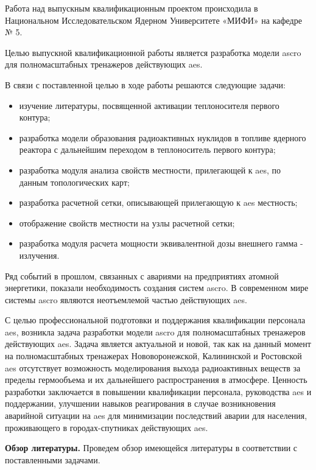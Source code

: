
Работа над выпускным квалификационным проектом происходила в Национальном Исследовательском Ядерном Университете «МИФИ» 
на кафедре № 5.

Целью выпускной квалификационной работы является разработка модели \ac{ascro} для полномасштабных тренажеров действующих 
\ac{aes}.

В связи с поставленной целью в ходе работы решаются следующие задачи:

\begin{itemize}
	\item изучение литературы, посвященной активации теплоносителя первого контура;
	\item разработка модели образования радиоактивных нуклидов в топливе ядерного реактора с дальнейшим переходом в
		теплоноситель первого контура;
	\item разработка модуля анализа свойств местности, прилегающей к \ac{aes}, по данным топологических карт;
	\item разработка расчетной сетки, описывающей прилегающую к \ac{aes} местность;
	\item отображение свойств местности на узлы расчетной сетки;
	\item разработка модуля расчета мощности эквивалентной дозы внешнего гамма - излучения.
\end{itemize}

Ряд событий в прошлом, связанных с авариями на предприятиях атомной энергетики, показали необходимость создания систем 
\ac{ascro}. В современном мире системы \ac{ascro} являются неотъемлемой частью действующих \ac{aes}. 

С целью профессиональной подготовки и поддержания квалификации персонала \ac{aes}, возникла задача разработки модели 
\ac{ascro} для полномасштабных тренажеров действующих \ac{aes}. Задача является актуальной и новой, так как на данный 
момент на полномасштабных тренажерах Нововоронежской, Калининской и Ростовской \ac{aes} отсутствует возможность 
моделирования выхода радиоактивных веществ за пределы гермообъема и их дальнейшего распространения в атмосфере. Ценность 
разработки заключается в повышении квалификации персонала, руководства \ac{aes} и поддержании, улучшении навыков 
реагирования в случае возникновения аварийной ситуации на \ac{aes} для минимизации последствий аварии для населения, 
проживающего в городах-спутниках действующих \ac{aes}.

\textbf{Обзор литературы.} Проведем обзор имеющейся литературы в соответствии с поставленными задачами.

